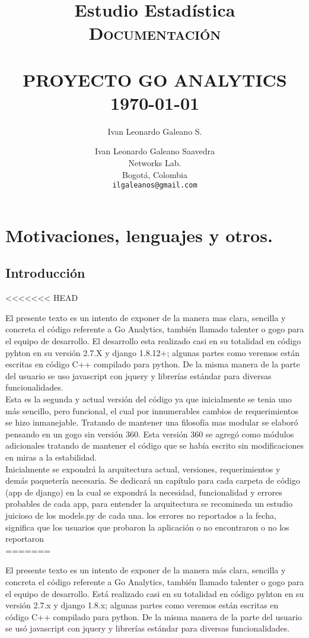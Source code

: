\documentclass[10pt,a4paper]{book}
\author{Ivan Leonardo Galeano S.}
\title{Estudio Estadística}
\title{	\normalsize \textsc{Documentación}
	\\[2.0cm]
	\HRule{0.5pt} \\
	\LARGE \textbf{\uppercase{Proyecto Go Analytics}}
	\HRule{2pt} \\ [0.5cm]
	\normalsize \today
}
\author{
	Ivan Leonardo Galeano Saavedra\\
	Networks Lab.\\
	Bogotá, Colombia\\
	\texttt{ilgaleanos@gmail.com} \\
}
\makeatletter
\def\printtitle{
	{\centering \@title\par}}
\def\printauthor{
	{\centering \large \@author}}
\makeatother
\begin{document}
	\thispagestyle{empty}
	\printtitle
	\vfill
	\printauthor

	\tableofcontents

	\chapter{Motivaciones, lenguajes y otros.}

	\section*{Introducción}
<<<<<<< HEAD

	El presente texto es un intento de exponer de la manera mas clara, sencilla y concreta el código referente a Go Analytics, también llamado talenter o gogo para el equipo de desarrollo. El desarrollo esta realizado casi en su totalidad en código pyhton en su versión 2.7.X y django 1.8.12+; algunas partes como veremos están escritas en código C++ compilado para python. De la misma manera de la parte del usuario se uso javascript con jquery y librerías estándar para diversas funcionalidades.\\

	Esta es la segunda y actual versión del código ya que inicialmente se tenia uno más sencillo, pero funcional, el cual por innumerables cambios de requerimientos se hizo inmanejable. Tratando de mantener una filosofía mas modular se elaboró pensando en un gogo sin versión 360. Esta versión 360 se agregó como módulos adicionales tratando de mantener el código que se había escrito sin modificaciones en miras a la estabilidad.\\

	Inicialmente se expondrá la arquitectura actual, versiones, requerimientos y demás paquetería necesaria. Se dedicará un capítulo para cada carpeta de código (app de django) en la cual se expondrá la necesidad, funcionalidad y errores probables de cada app, para entender la arquitectura se recomineda un estudio juicioso de los models.py de cada una. los errores no reportados a la fecha, significa que los usuarios que probaron la aplicación o no encontraron o no los reportaron\\

=======
	
	El presente texto es un intento de exponer de la manera más clara, sencilla y concreta el código referente a Go Analytics, también llamado talenter o gogo para el equipo de desarrollo. Está realizado casi en su totalidad en código pyhton en su versión 2.7.x y django 1.8.x; algunas partes como veremos están escritas en código C++ compilado para python. De la misma manera de la parte del usuario se usó javascript con jquery y librerías estándar para diversas funcionalidades.\\
	
\end{document}
